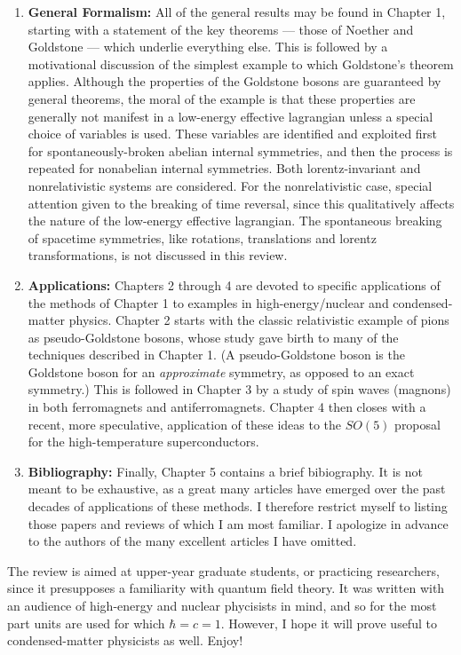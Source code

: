 \documentclass[12pt,epsf]{report}
\begin{document}
\begin{enumerate}
\item
{\bf General Formalism:}
All of the general results may be found in Chapter 1,
starting with a statement of the key theorems --- those of
Noether and Goldstone --- which underlie everything else.
This is followed by a motivational discussion of the
simplest example to which Goldstone's theorem applies.
Although the properties of the Goldstone bosons are
guaranteed by general theorems, the moral of the example is
that these properties are generally not manifest in a
low-energy effective lagrangian unless a special choice of
variables is used. These variables are identified and
exploited first for spontaneously-broken abelian internal
symmetries, and then the process is repeated for nonabelian
internal symmetries. Both lorentz-invariant and
nonrelativistic systems are considered. For the
nonrelativistic case, special attention given to the
breaking of time reversal, since this qualitatively affects
the nature of the low-energy effective lagrangian. The
spontaneous breaking of spacetime symmetries, like
rotations, translations and lorentz transformations, is not
discussed in this review.

\item
{\bf Applications:}
Chapters 2 through 4 are devoted to specific applications
of the methods of Chapter 1 to examples in
high-energy/nuclear and condensed-matter physics. Chapter 2
starts with the classic relativistic example of pions as
pseudo-Goldstone bosons, whose study gave birth to many of
the techniques described in Chapter 1. (A pseudo-Goldstone
boson is the Goldstone boson for an {\it approximate}
symmetry, as opposed to an exact symmetry.) This is
followed in Chapter 3 by a study of spin waves (magnons) in
both ferromagnets and antiferromagnets. Chapter 4 then
closes with a recent, more speculative, application of
these ideas to the $SO(5)$ proposal for the
high-temperature superconductors.

\item
{\bf Bibliography:}
Finally, Chapter 5 contains a brief bibiography. It is not
meant to be exhaustive, as a great many articles have
emerged over the past decades of applications of these
methods.  I therefore restrict myself to listing those
papers and reviews of which I am most familiar. I apologize
in advance to the authors of the many excellent  articles I
have omitted.
\end{enumerate}

The review is aimed at upper-year graduate students, or
practicing researchers, since it presupposes a familiarity
with quantum field theory. It was written with an
audience of high-energy and nuclear phycisists in mind, and
so for the most part units are used for which $\hbar = c =
1$. However, I hope it will prove useful to
condensed-matter physicists as well. Enjoy!
\end{document}
